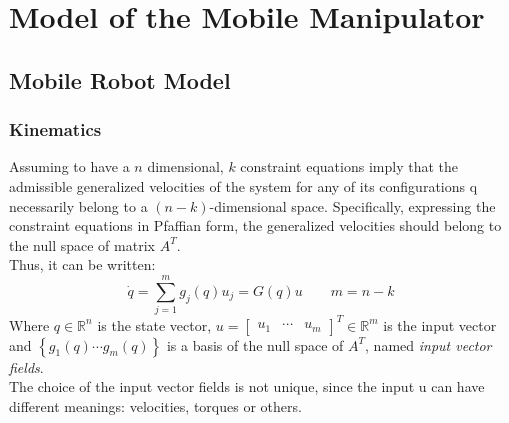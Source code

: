 \chapter{Model of the Mobile Manipulator}
\label{chapter2}

\section{Mobile Robot Model}
\subsection{Kinematics}
Assuming to have a $n$ dimensional, $k$ constraint equations imply that the admissible generalized velocities of the system for any of its configurations q necessarily belong to a $(n-k)$-dimensional space. Specifically, expressing the constraint equations in Pfaffian form, the generalized velocities should belong to the null space of matrix $A^T$.\\
Thus, it can be written:
\begin{equation} \label{G}
\dot{q}=\sum_{j=1}^{m} g_j(q)u_j=G(q)u \qquad m=n-k
\end{equation}
Where $q\in \mathbb{R}^n $ is the state vector, $u= \left[
\begin{matrix}
u_1 &  \cdots & u_m
\end{matrix}
\right]^T\in\mathbb{R}^m $ is the input vector and $\left\lbrace  g_1 (q) \cdots g_m (q) \right\rbrace $ is a basis of the null space of $A^T$, named \textit{input vector fields}. \\
The choice of the input vector fields is not unique, since the input u can have different meanings: velocities, torques or others.

